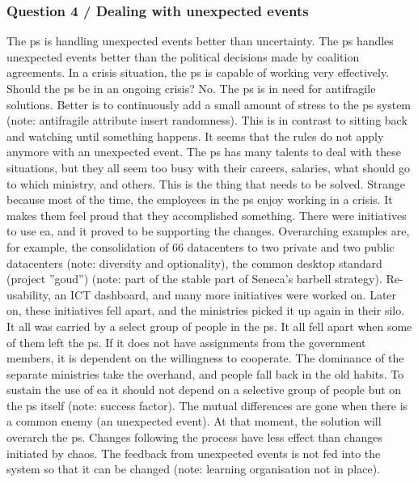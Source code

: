 \subsubsection{Question 4 / Dealing with unexpected events}
The \gls{ps} is handling unexpected events better than uncertainty. The \gls{ps} handles unexpected events better than the political decisions made by coalition agreements. In a crisis situation, the \gls{ps} is capable of working very effectively. Should the \gls{ps} be in an ongoing crisis? No. The \gls{ps} is in need for \gls{antifragile} solutions. Better is to continuously add a small amount of stress to the \gls{ps} system (note: antifragile attribute insert randomness). This is in contrast to sitting back and watching until something happens. It seems that the rules do not apply anymore with an unexpected event. The \gls{ps} has many talents to deal with these situations, but they all seem too busy with their careers, salaries, what should go to which ministry, and others. This is the thing that needs to be solved. Strange because most of the time, the employees in the \gls{ps} enjoy working in a crisis. It makes them feel proud that they accomplished something. There were initiatives to use \acrshort{ea}, and it proved to be supporting the changes. Overarching examples are, for example, the consolidation of 66 datacenters to two private and two public datacenters (note: diversity and optionality), the common desktop standard (project ''goud'') (note: part of the stable part of Seneca's barbell strategy). Re-usability, an ICT dashboard, and many more initiatives were worked on. Later on, these initiatives fell apart, and the ministries picked it up again in their silo. It all was carried by a select group of people in the \gls{ps}. It all fell apart when some of them left the \gls{ps}. If it does not have assignments from the government members, it is dependent on the willingness to cooperate. The dominance of the separate ministries take the overhand, and people fall back in the old habits. To sustain the use of \acrshort{ea} it should not depend on a selective group of people but on the \gls{ps} itself (note: success factor). The mutual differences are gone when there is a common enemy (an unexpected event). At that moment, the solution will overarch the \gls{ps}. Changes following the process have less effect than changes initiated by chaos. The feedback from unexpected events is not fed into the system so that it can be changed (note: learning organisation not in place).

